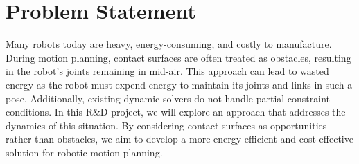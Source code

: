 \documentclass[report.tex]{subfiles}
\begin{document}
    \chapter{Problem Statement}
    Many robots today are heavy, energy-consuming, and costly to manufacture. During motion planning, contact surfaces are often treated as obstacles, resulting in the robot’s joints remaining in mid-air. This approach can lead to wasted energy as the robot must expend energy to maintain its joints and links in such a pose. Additionally, existing dynamic solvers do not handle partial constraint conditions. In this R\&D project, we will explore an approach that addresses the dynamics of this situation. By considering contact surfaces as opportunities rather than obstacles, we aim to develop a more energy-efficient and cost-effective solution for robotic motion planning.
\end{document}
